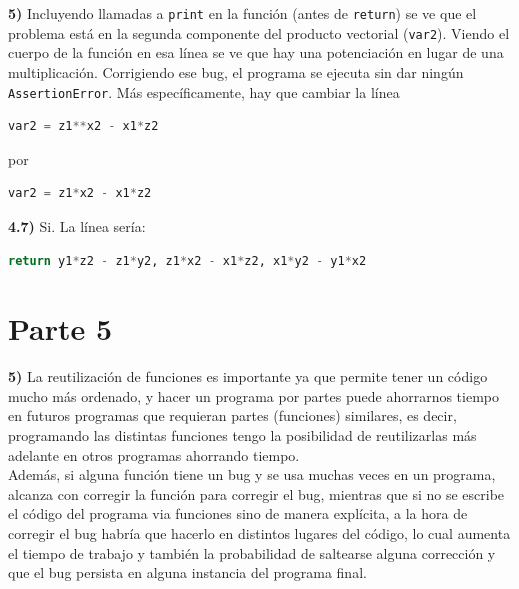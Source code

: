 \documentclass{article}
\begin{document}
\noindent
\textbf{5)} Incluyendo llamadas a \texttt{print} en la funci\'on (antes de \texttt{return}) se ve que el problema est\'a en la segunda componente del producto vectorial (\texttt{var2}). Viendo el cuerpo de la funci\'on en esa l\'inea se ve que hay una potenciaci\'on en lugar de una multiplicaci\'on. Corrigiendo ese bug, el programa se ejecuta sin dar ning\'un \texttt{AssertionError}. M\'as espec\'ificamente, hay que cambiar la l\'inea
\begin{lstlisting}[language=Python]
    var2 = z1**x2 - x1*z2
\end{lstlisting}
por
\begin{lstlisting}[language=Python]
    var2 = z1*x2 - x1*z2
\end{lstlisting}

\noindent
\textbf{4.7)}
Si. La l\'inea ser\'ia:
\begin{lstlisting}[language=Python]
    return y1*z2 - z1*y2, z1*x2 - x1*z2, x1*y2 - y1*x2
\end{lstlisting}

\section*{Parte 5}

\textbf{5)} La reutilizaci\'on de funciones es importante ya que permite tener un c\'odigo mucho m\'as ordenado, y hacer un programa por partes puede ahorrarnos tiempo en futuros programas que requieran partes (funciones) similares, es decir, programando las distintas funciones tengo la posibilidad de reutilizarlas m\'as adelante en otros programas ahorrando tiempo.\\

Adem\'as, si alguna funci\'on tiene un bug y se usa muchas veces en un programa, alcanza con corregir la funci\'on para corregir el bug, mientras que si no se escribe el c\'odigo del programa via funciones sino de manera expl\'icita, a la hora de corregir el bug habr\'ia que hacerlo en distintos lugares del c\'odigo, lo cual aumenta el tiempo de trabajo y tambi\'en la probabilidad de saltearse alguna correcci\'on y que el bug persista en alguna instancia del programa final.
\end{document}

